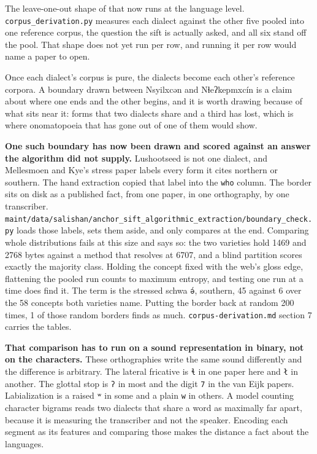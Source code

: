 The leave-one-out shape of that now runs at the language level. \texttt{corpus\_\allowbreak{}derivation.\allowbreak{}py} measures each dialect against the other five pooled into one reference corpus, the question the sift is actually asked, and all six stand off the pool. That shape does not yet run per row, and running it per row would name a paper to open.

Once each dialect's corpus is pure, the dialects become each other's reference corpora. A boundary drawn between Nsyilxcən and Nɬeʔkepmxcín is a claim about where one ends and the other begins, and it is worth drawing because of what sits near it: forms that two dialects share and a third has lost, which is where onomatopoeia that has gone out of one of them would show.

\textbf{One such boundary has now been drawn and scored against an answer the algorithm did not supply.} Lushootseed is not one dialect, and Mellesmoen and Kye's stress paper labels every form it cites northern or southern. The hand extraction copied that label into the \texttt{who} column. The border sits on disk as a published fact, from one paper, in one orthography, by one transcriber. \texttt{maint/\allowbreak{}data/\allowbreak{}salishan/\allowbreak{}anchor\_\allowbreak{}sift\_\allowbreak{}algorithmic\_\allowbreak{}extraction/\allowbreak{}boundary\_\allowbreak{}check.\allowbreak{}py} loads those labels, sets them aside, and only compares at the end. Comparing whole distributions fails at this size and says so: the two varieties hold 1469 and 2768 bytes against a method that resolves at 6707, and a blind partition scores exactly the majority class. Holding the concept fixed with the web's gloss edge, flattening the pooled run counts to maximum entropy, and testing one run at a time does find it. The term is the stressed schwa \texttt{ə́}, southern, 45 against 6 over the 58 concepts both varieties name. Putting the border back at random 200 times, 1 of those random borders finds as much. \texttt{corpus-\allowbreak{}derivation.\allowbreak{}md} section 7 carries the tables.

\textbf{That comparison has to run on a sound representation in binary, not on the characters.} These orthographies write the same sound differently and the difference is arbitrary. The lateral fricative is \texttt{ɬ} in one paper here and \texttt{ł} in another. The glottal stop is \texttt{ʔ} in most and the digit \texttt{7} in the van Eijk papers. Labialization is a raised \texttt{ʷ} in some and a plain \texttt{w} in others. A model counting character bigrams reads two dialects that share a word as maximally far apart, because it is measuring the transcriber and not the speaker. Encoding each segment as its features and comparing those makes the distance a fact about the languages.

